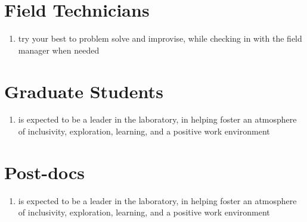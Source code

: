 \documentclass[12pt]{article}
\begin{document}
\section{Field Technicians}
\begin{enumerate}
\item try your best to problem solve and improvise, while checking in
  with the field manager when needed
\end{enumerate}


\section{Graduate Students}
\begin{enumerate}
\item is expected to be a leader in the laboratory, in helping foster
  an atmosphere of inclusivity, exploration, learning, and a positive
  work environment
\end{enumerate}

\section{Post-docs}
\begin{enumerate}
\item is expected to be a leader in the laboratory, in helping foster
  an atmosphere of inclusivity, exploration, learning, and a positive
  work environment
\end{enumerate}
\end{document}

